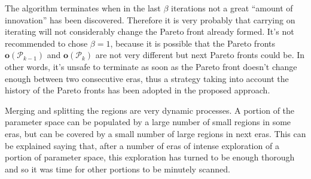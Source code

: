 \begin{remark}
\label{rem:termination}The algorithm terminates when in the last
$\beta$ iterations not a great ``amount of innovation'' has been
discovered. Therefore it is very probably that carrying on iterating
will not considerably change the Pareto front already formed. It's
not recommended to chose $\beta=1$, because it is possible that the
Pareto fronts $\mathbf{o}\left(\mathscr{P}_{k-1}\right)$ and $\mathbf{o}\left(\mathscr{P}_{k}\right)$
are not very different but next Pareto fronts could be. In other words,
it's unsafe to terminate as soon as the Pareto front doesn't change
enough between two consecutive eras, thus a strategy taking into
account the history of the Pareto fronts has been adopted in the
proposed approach.
\end{remark}


\begin{remark}
Merging and splitting the regions are very dynamic processes. A portion
of the parameter space can be populated by a large number of small
regions in some eras, but can be covered by a small number of large
regions in next eras. This can be explained saying that, after a number
of eras of intense exploration of a portion of parameter space, this
exploration has turned to be enough thorough and so it was time for
other portions to be minutely scanned.
\end{remark}
